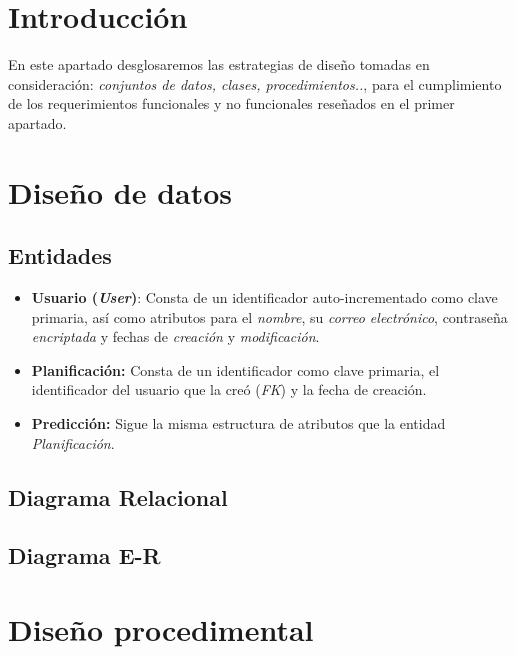 
\section{Introducción}

En este apartado desglosaremos las estrategias de diseño tomadas en consideración: \textit{conjuntos de datos, clases, procedimientos..}, para el cumplimiento de los requerimientos funcionales y no funcionales reseñados en el primer apartado.

\section{Diseño de datos}

\subsection{Entidades}

\begin{itemize}
    \item \textbf{Usuario (\textit{User})}: Consta de un identificador auto-incrementado como clave primaria, así como atributos para el \textit{nombre}, su \textit{correo electrónico}, contraseña \textit{encriptada} y fechas de \textit{creación} y \textit{modificación}.
    \item \textbf{Planificación:} Consta de un identificador como clave primaria, el identificador del usuario que la creó (\textit{FK}) y la fecha de creación.
    \item \textbf{Predicción:} Sigue la misma estructura de atributos que la entidad \textit{Planificación}.
\end{itemize}

\newpage
\subsection{Diagrama Relacional}



\subsection{Diagrama E-R}


\newpage

\section{Diseño procedimental}

